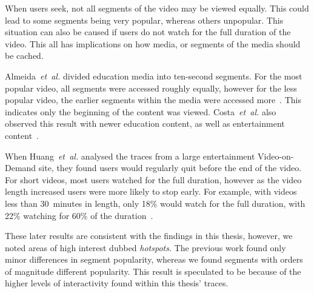 

    When users seek, not all segments of the video may be viewed equally. This could lead to some segments being very popular, whereas others unpopular. This situation can also be caused if users do not watch for the full duration of the video. This all has implications on how media, or segments of the media should be cached.

    Almeida~\emph{et~al.} divided education media into ten-second segments. For the most popular video, all segments were accessed roughly equally, however for the less popular video, the earlier segments within the media were accessed more~\cite{almeida2001aem}. This indicates only the beginning of the content was viewed. Costa~\emph{et~al.} also observed this result with newer education content, as well as entertainment content~\cite{costa2004aci}.

    When Huang~\emph{et~al.} analysed the traces from a large entertainment Video-on-Demand site, they found users would regularly quit before the end of the video. For short videos, most users watched for the full duration, however as the video length increased users were more likely to stop early. For example, with videos less than 30~minutes in length, only 18\% would watch for the full duration, with 22\% watching for 60\% of the duration~\cite{huang2007civ}.


    These later results are consistent with the findings in this thesis, however, we noted areas of high interest dubbed \emph{hotspots}. The previous work found only minor differences in segment popularity, whereas we found segments with orders of magnitude different popularity. This result is speculated to be because of the higher levels of interactivity found within this thesis' traces.

